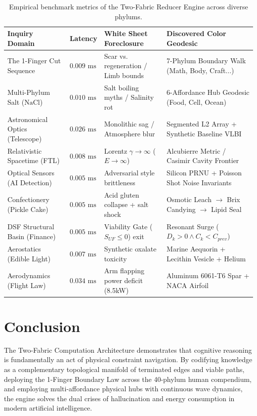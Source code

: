 \documentclass[11pt,a4paper]{article}
\begin{document}
\begin{table}[h!]
\centering
\small
\begin{tabular}{@{}llll@{}}
\toprule
\textbf{Inquiry Domain} & \textbf{Latency} & \textbf{White Sheet Foreclosure} & \textbf{Discovered Color Geodesic} \\
\midrule
The 1-Finger Cut Sequence & $0.009\text{ ms}$ & Scar vs. regeneration / Limb bounds & 7-Phylum Boundary Walk (Math, Body, Craft...) \\
Multi-Phylum Salt ($\text{NaCl}$) & $0.010\text{ ms}$ & Salt boiling myths / Salinity rot & 6-Affordance Hub Geodesic (Food, Cell, Ocean) \\
Astronomical Optics (Telescope) & $0.026\text{ ms}$ & Monolithic sag / Atmosphere blur & Segmented L2 Array + Synthetic Baseline VLBI \\
Relativistic Spacetime (FTL) & $0.008\text{ ms}$ & Lorentz $\gamma \to \infty$ ($E \to \infty$) & Alcubierre Metric / Casimir Cavity Frontier \\
Optical Sensors (AI Detection) & $0.005\text{ ms}$ & Adversarial style brittleness & Silicon PRNU + Poisson Shot Noise Invariants \\
Confectionery (Pickle Cake) & $0.005\text{ ms}$ & Acid gluten collapse + salt shock & Osmotic Leach $\to$ Brix Candying $\to$ Lipid Seal \\
DSF Structural Basin (Finance) & $0.005\text{ ms}$ & Viability Gate ($S_{UF} \le 0$) exit & Resonant Surge ($D_k > 0 \land C_k < C_{prev}$) \\
Aerostatics (Edible Light) & $0.007\text{ ms}$ & Synthetic oxalate toxicity & Marine Aequorin + Lecithin Vesicle + Helium \\
Aerodynamics (Flight Law) & $0.034\text{ ms}$ & Arm flapping power deficit (8.5kW) & Aluminum 6061-T6 Spar + NACA Airfoil \\
\bottomrule
\end{tabular}
\caption{Empirical benchmark metrics of the Two-Fabric Reducer Engine across diverse phylums.}
\end{table}

\section{Conclusion}
The Two-Fabric Computation Architecture demonstrates that cognitive reasoning is fundamentally an act of physical constraint navigation. By codifying knowledge as a complementary topological manifold of terminated edges and viable paths, deploying the 1-Finger Boundary Law across the 40-phylum human compendium, and employing multi-affordance physical hubs with continuous wave dynamics, the engine solves the dual crises of hallucination and energy consumption in modern artificial intelligence.
\end{document}
